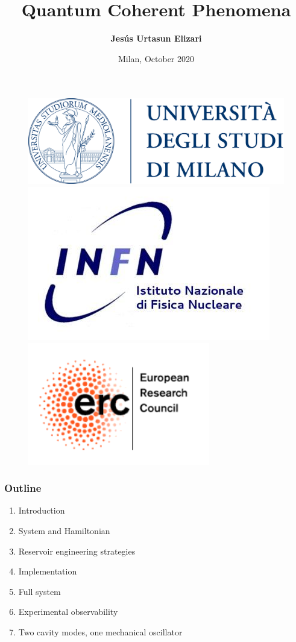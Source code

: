 \documentclass[aspectratio=43]{beamer}
\title[QCD and Monte Carlo]{Quantum Coherent Phenomena}
\author{\textbf {Jes\'us Urtasun Elizari}}
\date{Milan, October 2020}
\begin{document}
\begin{frame}

	\vspace{1.0 cm}
	
	
	\vspace{0.25 cm}

	\begin{figure}
		\includegraphics[width = 3.0 cm]{plots/logo_unimi.png}
		\hfill
		\includegraphics[width = 3.0 cm]{plots/logo_infn.png}
		\hfill
		\includegraphics[width = 3.0 cm]{plots/logo_erc.png}
		\endminipage
	\end{figure}

	\vspace{1.0 cm}

\end{frame}

\begin{frame}

	\frametitle{Outline}
	
	\begin{enumerate}
		\item {\color{blue}Introduction}
		\item {\color{blue}System and Hamiltonian}
		\item {\color{blue}Reservoir engineering strategies}
		\item {\color{blue}Implementation}
		\item {\color{blue}Full system}
		\item {\color{blue}Experimental observability}
		\item {\color{blue}Two cavity modes, one mechanical oscillator}
	\end{enumerate}
	
\end{frame}
\end{document}
